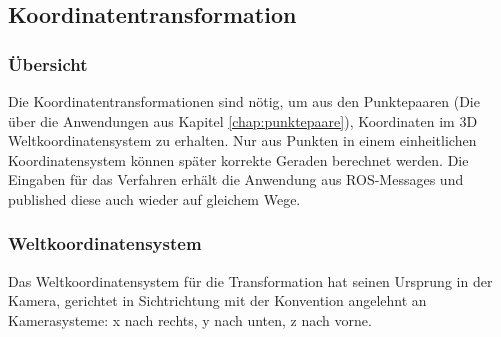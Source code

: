 \subsection{Koordinatentransformation}
\subsubsection{Übersicht}
Die Koordinatentransformationen sind nötig, um aus den Punktepaaren (Die über die Anwendungen aus Kapitel \ref{chap:punktepaare}), Koordinaten im 3D Weltkoordinatensystem zu erhalten. Nur aus Punkten in einem einheitlichen Koordinatensystem können später korrekte Geraden berechnet werden.
Die Eingaben für das Verfahren erhält die Anwendung aus ROS-Messages und published diese auch wieder auf gleichem Wege.
\subsubsection{Weltkoordinatensystem}
Das Weltkoordinatensystem für die Transformation hat seinen Ursprung in der Kamera, gerichtet in Sichtrichtung mit der Konvention angelehnt an Kamerasysteme: x nach rechts, y nach unten, z nach vorne.
